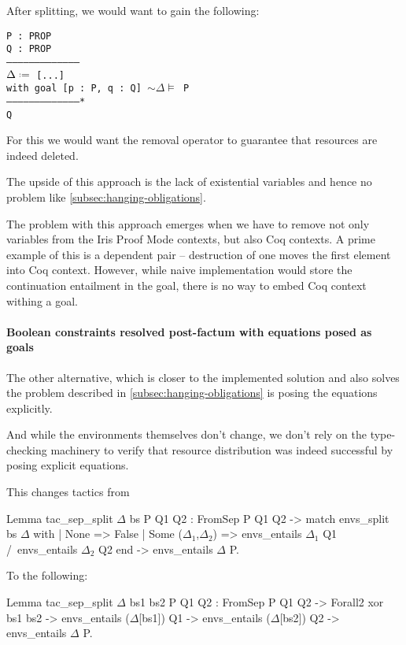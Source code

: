{After splitting, we would want to gain the following:

\begin{minipage}{\linewidth}
\texttt{P : PROP\\
Q : PROP\\
---------------------------------------\\
$\Delta \defeq$ [...]\\
with goal [p : P, q : Q] $\sim \Delta \vDash$ P\\
---------------------------------------*\\
Q
}
\end{minipage}

For this we would want the removal operator to guarantee that resources are indeed deleted.

The upside of this approach is the lack of existential variables and hence no problem like \ref{subsec:hanging-obligations}.

The problem with this approach emerges when we have to remove not only variables from the Iris Proof Mode contexts, but also Coq contexts.
A prime example of this is a dependent pair -- destruction of one moves the first element into Coq context.
However, while naive implementation would store the continuation entailment in the goal, there is no way to embed Coq context withing a goal.

\paragraph{Boolean constraints resolved post-factum with equations posed as goals}

The other alternative, which is closer to the implemented solution and also solves the problem described in \ref{subsec:hanging-obligations} is posing the equations explicitly.

And while the environments themselves don't change, we don't rely on the type-checking machinery to verify that resource distribution was indeed successful by posing explicit equations.

This changes tactics from
\begin{coq}
  Lemma tac_sep_split $\Delta$ bs P Q1 Q2 :
  FromSep P Q1 Q2 ->
  match envs_split bs $\Delta$ with
  | None => False
  | Some ($\Delta_1$,$\Delta_2$) => envs_entails $\Delta_1$ Q1 /\ envs_entails $\Delta_2$ Q2
  end -> envs_entails $\Delta$ P.
\end{coq}

To the following:
\begin{coq}
  Lemma tac_sep_split $\Delta$ bs1 bs2 P Q1 Q2 :
  FromSep P Q1 Q2 ->
  Forall2 xor bs1 bs2 ->
  envs_entails ($\Delta$[bs1]) Q1 ->
  envs_entails ($\Delta$[bs2]) Q2 ->
  envs_entails $\Delta$ P.
\end{coq}

}
